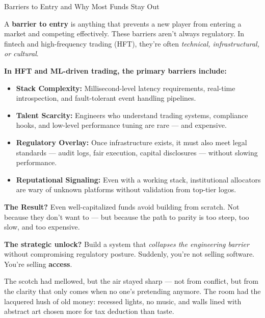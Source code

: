 \begin{TechnicalSidebar}{Barriers to Entry and Why Most Funds Stay Out}

  A \textbf{barrier to entry} is anything that prevents a new player from entering a market and competing effectively.  
  These barriers aren’t always regulatory. In fintech and high-frequency trading (HFT), they’re often 
  \textit{technical, infrastructural, or cultural}.
  
  \medskip
  
  \textbf{In HFT and ML-driven trading, the primary barriers include:}

  \medskip
  
  \begin{itemize}
    \item \textbf{Stack Complexity:}  
    Millisecond-level latency requirements, real-time introspection, and fault-tolerant event handling pipelines.
  
    \item \textbf{Talent Scarcity:}  
    Engineers who understand trading systems, compliance hooks, and low-level performance tuning are rare — and expensive.
  
    \item \textbf{Regulatory Overlay:}  
    Once infrastructure exists, it must also meet legal standards — audit logs, fair execution, capital disclosures — without slowing performance.
  
    \item \textbf{Reputational Signaling:}  
    Even with a working stack, institutional allocators are wary of unknown platforms without validation from top-tier logos.
  \end{itemize}
  
  \medskip
  
  \textbf{The Result?}  
  Even well-capitalized funds avoid building from scratch.  
  Not because they don’t want to — but because the path to parity is too steep, too slow, and too expensive.
  
  \medskip
  
  \textbf{The strategic unlock?}  
  Build a system that \textit{collapses the engineering barrier} without compromising regulatory posture.  
  Suddenly, you’re not selling software. You’re selling \textbf{access}.
  
\end{TechnicalSidebar}


\medskip

The scotch had mellowed, but the air stayed sharp — not from conflict, but from the clarity that only comes when no one’s 
pretending anymore. The room had the lacquered hush of old money: recessed lights, no music, and walls lined with abstract 
art chosen more for tax deduction than taste.


